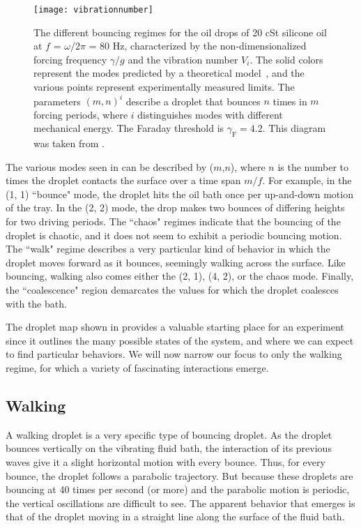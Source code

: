 	    \begin{figure}[h]
	       \centering
	    \texttt{[image: vibrationnumber]}
	     \caption{The different bouncing regimes for the oil drops of 20 cSt silicone oil at $f$ = $\omega / 2\pi$ = 80 Hz, characterized by the non-dimensionalized forcing frequency $\gamma/g$ and the vibration number $V_i$. The solid colors represent the  modes predicted by a theoretical model~, and the various points represent experimentally measured limits. The parameters $(m,n)^{i}$ describe a droplet that bounces $n$ times in $m$ forcing periods, where $i$ distinguishes modes with different mechanical energy. The Faraday threshold is $\gamma_\mathrm{F} = 4.2$. This diagram was taken from .}
	 \label{regime}
	\end{figure}

The various modes seen in  can be described by ($m$,$n$), where $n$ is the number to times the droplet contacts the surface over a time span $m/f$. For example, in the (1, 1) ``bounce" mode, the droplet hits the oil bath once per up-and-down motion of the tray. In the (2, 2) mode, the drop makes two bounces of differing heights for two driving periods. The ``chaos" regimes indicate that the bouncing of the droplet is chaotic, and it does not seem to exhibit a periodic bouncing motion. The ``walk" regime describes a very particular kind of behavior in which the droplet moves forward as it bounces, seemingly walking across the surface. Like bouncing, walking also comes either the (2, 1), (4, 2), or the chaos mode. Finally, the ``coalescence" region demarcates the values for which the droplet coalesces with the bath.

The droplet map shown in  provides a valuable starting place for an experiment since it outlines the many possible states of the system, and where we can expect to find particular behaviors. We will now narrow our focus to only the walking regime, for which a variety of fascinating interactions emerge.

	        \subsection{Walking}
A walking droplet is a very specific type of bouncing droplet. As the droplet bounces vertically on the vibrating fluid bath, the interaction of its previous waves give it a slight horizontal motion with every bounce. Thus, for every bounce, the droplet follows a parabolic trajectory. But because these droplets are bouncing at 40 times per second (or more) and the parabolic motion is periodic, the vertical oscillations are difficult to see. The apparent behavior that emerges is that of the droplet moving in a straight line along the surface of the fluid bath.             

